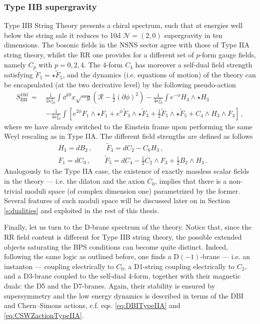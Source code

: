 \subsubsection*{Type IIB supergravity}

Type IIB String Theory presents a chiral spectrum, such that at energies well below the string sale it reduces to 10d $\mathcal{N}=(2,0)$ supergravity in ten dimensions. The bosonic fields in the NSNS sector agree with those of Type IIA string theory, whilst the RR one provides for a different set of $p$-form gauge fields, namely $C_p$ with $p=0,2,4$. The 4-form $C_4$ has moreover a self-dual field strength satisfying $\tilde F_5= \star \tilde F_5$, and the dynamics (i.e. equations of motion) of the theory can be encapsulated (at the two derivative level) by the following pseudo-action \cite{Polchinski:1998rr} 
%
\begin{equation}\label{eq:IIB10d}
			\begin{aligned}
				S_\text{IIB}^{\text{10d}}\, =\, & \frac{1}{2\kappa_{10}^2} \int \dd^{10}x\sqrt{-g} \left(\mathcal{R}-\frac{1}{2}(\partial \phi)^2\right) -\frac{1}{4\kappa_{10}^2}\int e^{-\phi} H_3\wedge \star H_3 \\
				&-\frac{1}{4\kappa_{10}^2}\int \left[e^{2 \phi}F_1 \wedge \star F_1 + e^{\phi} \tilde F_3 \wedge \star \tilde F_3 + \frac{1}{2} \tilde F_5 \wedge \star \tilde F_5  +C_4\wedge H_3 \wedge F_3\right]\,,
			\end{aligned}
\end{equation}
%
where we have already switched to the Einstein frame upon performing the same Weyl rescaling as in Type IIA. The different field strengths are defined as follows
%
\begin{equation}
\begin{aligned}
&H_3=dB_2\, , \qquad  \tilde{F}_3=dC_2-C_0 H_3\, ,\\
&F_1=d C_0\, , \qquad \tilde{F}_5= dC_4-\frac{1}{2} C_2 \wedge F_3 + \frac{1}{2} B_2 \wedge H_3\, . 
\end{aligned}
\end{equation}
%
Analogously to the Type IIA case, the existence of exactly massless scalar fields in the theory --- i.e. the dilaton and the axion $C_0$, implies that there is a non-trivial moduli space (of complex dimension one) parametrized by the former. Several features of such moduli space will be discussed later on in Section \ref{s:dualities} and exploited in the rest of this thesis.

Finally, let us turn to the D-brane spectrum of the theory. Notice that, since the RR field content is different for Type IIB string theory, the possible extended objects saturating the BPS conditions can become quite distinct. Indeed, following the same logic as outlined before, one finds a D$(-1)$-brane --- i.e. an instanton --- coupling electrically to $C_0$, a D1-string coupling electrically to $C_2$, and a D3-brane coupled to the self-dual 4-form, together with their magnetic duals: the D5 and the D7-branes. Again, their stability is ensured by supersymmetry and the low energy dynamics is described in terms of the DBI and Chern--Simons actions, c.f. eqs. \eqref{eq:DBITypeIIA} and \eqref{eq:CSWZactionTypeIIA}. 

